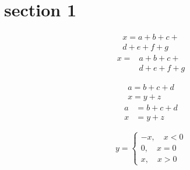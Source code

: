 \documentclass[12pt]{article}
\begin{document}
    \section{section 1}
    \begin{multline}
        x = a+b+c+{} \\
        d+e+f+g
    \end{multline}
    \[ \begin{split}
        x ={} &a+b+c+{} \\
              &d+e+f+g
    \end{split} \]
    
    \begin{gather}
        a = b+c+d \\
        x = y+z
    \end{gather}
    \begin{align*}
        a &= b+c+d \\
        x &= y+z
    \end{align*}
    
    \[ y=\begin{cases}
        -x,\quad x<0 \\
        0,\quad x=0 \\
        x,\quad x>0
    \end{cases} \]
\end{document}
